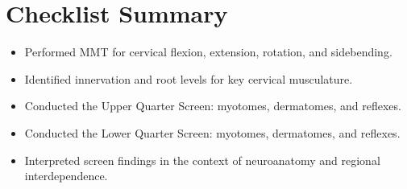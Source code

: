 \section*{Checklist Summary}
\begin{itemize}
  \item [$\square$] Performed MMT for cervical flexion, extension, rotation, and sidebending.
  \item [$\square$] Identified innervation and root levels for key cervical musculature.
  \item [$\square$] Conducted the Upper Quarter Screen: myotomes, dermatomes, and reflexes.
  \item [$\square$] Conducted the Lower Quarter Screen: myotomes, dermatomes, and reflexes.
  \item [$\square$] Interpreted screen findings in the context of neuroanatomy and regional interdependence.
\end{itemize}